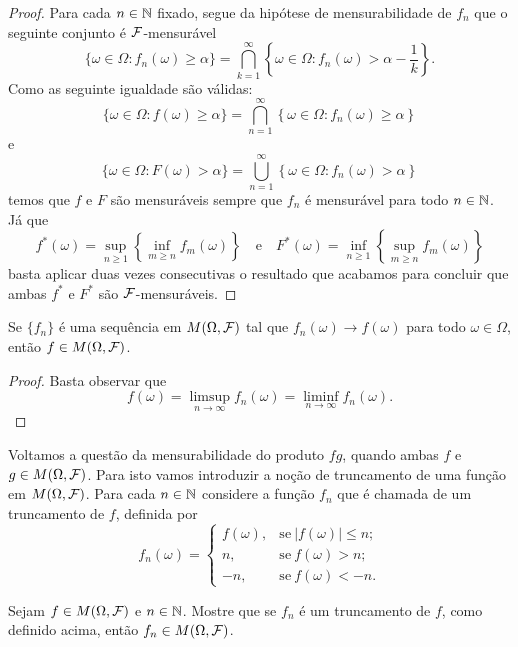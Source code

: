 \begin{proof}
Para cada $n\in\mathbb{N}$ fixado, segue da 
hipótese de mensurabilidade de $f_n$ que 
o seguinte conjunto é $\mathcal{F}$-mensurável
\[
\{\omega\in\Omega: f_n(\omega)\geq \alpha\}
=
\bigcap_{k=1}^{\infty}
\left\{
	\omega\in\Omega: f_n(\omega)>\alpha-\frac{1}{k} 
\right\}. 
\]
Como as seguinte igualdade são válidas:
	\[	
	\{\omega\in\Omega: f(\omega)\geq \alpha\} 
	=
	\bigcap_{n=1}^{\infty}
	\left\{
		\omega\in\Omega: f_n(\omega)\geq \alpha 
	\right\}
	\]
e
 	\[
 	\{\omega\in\Omega: F(\omega)> \alpha\} 
	=
	\bigcup_{n=1}^{\infty}
	\left\{
		\omega\in\Omega: f_n(\omega)> \alpha 
	\right\}
	\]
temos que $f$ e $F$ são mensuráveis sempre que $f_n$
é mensurável para todo $n\in\mathbb{N}$.
Já que 
	\[	
	f^*(\omega)
	=
	\sup_{n\geq 1}
	\left\{ \inf_{m\geq n} f_{m}(\omega) \right\}
	\quad
	\text{e}
	\quad
	F^*(\omega)
	=
	\inf_{n\geq 1}
	\left\{ \sup_{m\geq n} f_{m}(\omega) \right\}
	\]
basta aplicar duas vezes consecutivas o resultado que acabamos 
para concluir que ambas $f^*$ e $F^*$ são $\mathcal{F}$-mensuráveis.
\end{proof}




\begin{corolario}\label{cor-lim-mensuravel-eh-mensuravel}
Se $\{f_n\}$ é uma sequência em $M(\Omega,\mathcal{F})$ tal que
$f_n(\omega)\to f(\omega)$ para todo $\omega\in\Omega$,
então $f\in M(\Omega,\mathcal{F})$.
\end{corolario} 

\begin{proof}
	Basta observar que 
		\[
			f(\omega) 
			=\limsup_{n\to\infty} f_n(\omega)
			=\liminf_{n\to\infty} f_n(\omega).
		\]
\end{proof}


Voltamos a questão da mensurabilidade do produto $fg$,
quando ambas $f$ e $g\in M(\Omega,\mathcal{F})$. Para isto 
vamos introduzir a noção de truncamento de uma função em 
$M(\Omega,\mathcal{F})$. Para cada $n\in\mathbb{N}$ considere a função 
$f_n$ que é chamada de um truncamento de $f$, definida por 
	\[
		f_n(\omega)
		=
		\begin{cases}
			f(\omega),&\text{se}\ |f(\omega)|\leq n;
			\\
			n,&\text{se}\ f(\omega)>n;
			\\
			-n,&\text{se}\ f(\omega)<-n.
		\end{cases}
	\]
\begin{exercicio}
	Sejam $f\in M(\Omega,\mathcal{F})$ e $n\in\mathbb{N}$. 
	Mostre que se $f_n$ é um truncamento de $f$, 
	como definido acima, então $f_n\in M(\Omega,\mathcal{F})$. 
\end{exercicio}


